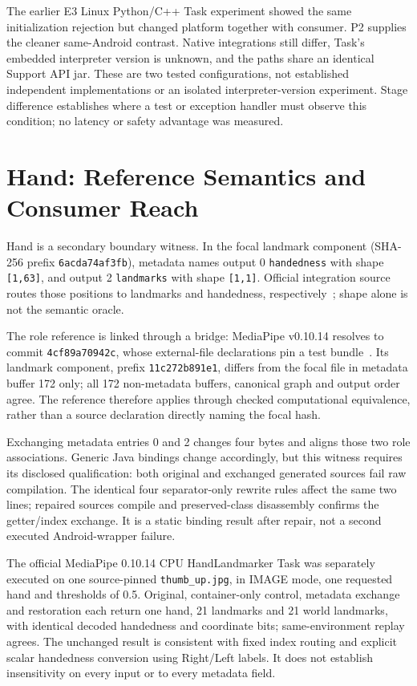 \documentclass[10pt,twocolumn,letterpaper]{article}
\newcommand{\code}[1]{\texttt{#1}}
\begin{document}
The earlier E3 Linux Python/C++ Task experiment showed the same initialization rejection but changed platform together with consumer. P2 supplies the cleaner same-Android contrast. Native integrations still differ, Task's embedded interpreter version is unknown, and the paths share an identical Support API jar. These are two tested configurations, not established independent implementations or an isolated interpreter-version experiment. Stage difference establishes where a test or exception handler must observe this condition; no latency or safety advantage was measured.

\section{Hand: Reference Semantics and Consumer Reach}
\label{sec:hand}
Hand is a secondary boundary witness. In the focal landmark component (SHA-256 prefix \code{6acda74af3fb}), metadata names output 0 \code{handedness} with shape \code{[1,63]}, and output 2 \code{landmarks} with shape \code{[1,1]}. Official integration source routes those positions to landmarks and handedness, respectively~\cite{hand-graph}; shape alone is not the semantic oracle.

The role reference is linked through a bridge: MediaPipe v0.10.14 resolves to commit \code{4cf89a70942c}, whose external-file declarations pin a test bundle~\cite{hand-assets}. Its landmark component, prefix \code{11c272b891e1}, differs from the focal file in metadata buffer 172 only; all 172 non-metadata buffers, canonical graph and output order agree. The reference therefore applies through checked computational equivalence, rather than a source declaration directly naming the focal hash.

Exchanging metadata entries 0 and 2 changes four bytes and aligns those two role associations. Generic Java bindings change accordingly, but this witness requires its disclosed qualification: both original and exchanged generated sources fail raw compilation. The identical four separator-only rewrite rules affect the same two lines; repaired sources compile and preserved-class disassembly confirms the getter/index exchange. It is a static binding result after repair, not a second executed Android-wrapper failure.

The official MediaPipe 0.10.14 CPU HandLandmarker Task was separately executed on one source-pinned \code{thumb\_up.jpg}, in IMAGE mode, one requested hand and thresholds of 0.5. Original, container-only control, metadata exchange and restoration each return one hand, 21 landmarks and 21 world landmarks, with identical decoded handedness and coordinate bits; same-environment replay agrees. The unchanged result is consistent with fixed index routing and explicit scalar handedness conversion using Right/Left labels. It does not establish insensitivity on every input or to every metadata field.
\end{document}
